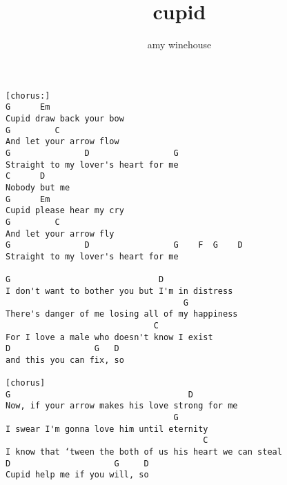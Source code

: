 \author{amy winehouse}
\title{cupid}
\maketitle
\begin{verbatim}
[chorus:]
G      Em 
Cupid draw back your bow 
G         C 
And let your arrow flow 
G               D                 G 
Straight to my lover's heart for me 
C      D       
Nobody but me  
G      Em                   
Cupid please hear my cry 
G         C 
And let your arrow fly 
G               D                 G    F  G    D   
Straight to my lover's heart for me 

G                              D 
I don't want to bother you but I'm in distress 
                                    G 
There's danger of me losing all of my happiness 
                              C 
For I love a male who doesn't know I exist 
D                 G   D   
and this you can fix, so 

[chorus]
G                                    D 
Now, if your arrow makes his love strong for me 
                                  G 
I swear I'm gonna love him until eternity 
                                        C 
I know that ‘tween the both of us his heart we can steal 
D                     G     D 
Cupid help me if you will, so 
\end{verbatim}
